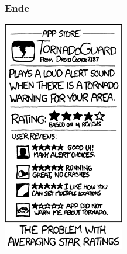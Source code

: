 \documentclass{beamer}
\begin{document}
\begin{frame}
\frametitle{Ende}
\includegraphics[scale=0.4]{tornadoguard.png}
\end{frame}
\end{document}
